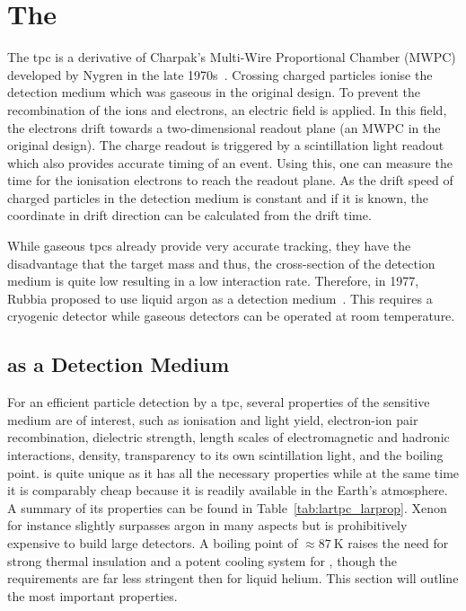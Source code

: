 \chapter{The }
\label{chap:lartpc}

The \gls{tpc} is a derivative of Charpak's Multi-Wire Proportional Chamber (MWPC)\cite{mwpc} developed by Nygren in the late 1970s~\cite{nygrenTPC}.
Crossing charged particles ionise the detection medium which was gaseous in the original design.
To prevent the recombination of the ions and electrons, an electric field is applied.
In this field, the electrons drift towards a two-dimensional readout plane (an MWPC in the original design).
The charge readout is triggered by a scintillation light readout which also provides accurate timing of an event.
Using this, one can measure the time for the ionisation electrons to reach the readout plane.
As the drift speed of charged particles in the detection medium is constant and if it is known, the coordinate in drift direction can be calculated from the drift time.

While gaseous \glspl{tpc} already provide very accurate tracking, they have the disadvantage that the target mass and thus, the cross-section of the detection medium is quite low resulting in a low interaction rate.
Therefore, in 1977, Rubbia proposed to use liquid argon as a detection medium~\cite{lartpc}.
This requires a cryogenic detector while gaseous detectors can be operated at room temperature.


\section{ as a Detection Medium}
\label{sec:lartpc_lar}

For an efficient particle detection by a \gls{tpc}, several properties of the sensitive medium are of interest, such as ionisation and light yield, electron-ion pair recombination, dielectric strength, length scales of electromagnetic and hadronic interactions, density, transparency to its own scintillation light, and the boiling point.
\lar{} is quite unique as it has all the necessary properties while at the same time it is comparably cheap because it is readily available in the Earth's atmosphere.
A summary of its properties can be found in Table~\ref{tab:lartpc_larprop}.
Xenon for instance slightly surpasses argon in many aspects but is prohibitively expensive to build large detectors.
A boiling point of $\approx \SI{87}{\kelvin}$ raises the need for strong thermal insulation and a potent cooling system for \lar{}, though the requirements are far less stringent then for liquid helium.
This section will outline the most important \lar{} properties.

